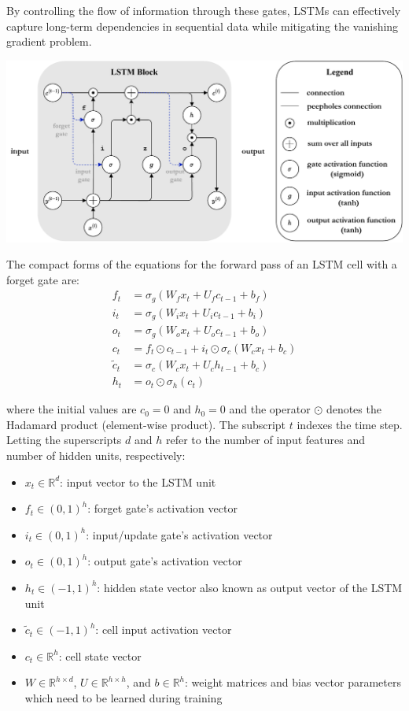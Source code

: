\documentclass[a4paper]{report}
\begin{document}
{By controlling the flow of information through these gates, LSTMs can effectively capture long-term dependencies in sequential data while mitigating the vanishing gradient problem.
\begin{center}
\includegraphics[width=0.9\linewidth]{lstm.pdf}
\end{center}
The compact forms of the equations for the forward pass of an LSTM cell with a forget gate are:
$${\displaystyle {\begin{aligned}f_{t}&=\sigma _{g}(W_{f}x_{t}+U_{f}c_{t-1}+b_{f})\\i_{t}&=\sigma _{g}(W_{i}x_{t}+U_{i}c_{t-1}+b_{i})\\o_{t}&=\sigma _{g}(W_{o}x_{t}+U_{o}c_{t-1}+b_{o})\\c_{t}&=f_{t}\odot c_{t-1}+i_{t}\odot \sigma _{c}(W_{c}x_{t}+b_{c})\\{\tilde {c}}_{t}&=\sigma _{c}(W_{c}x_{t}+U_{c}h_{t-1}+b_{c})\\h_{t}&=o_{t}\odot \sigma _{h}(c_{t})\end{aligned}}}$$

where the initial values are ${\displaystyle c_{0}=0}$ and ${\displaystyle h_{0}=0}$ and the operator ${\displaystyle \odot }$ denotes the Hadamard product (element-wise product). The subscript ${\displaystyle t}$ indexes the time step.\\
Letting the superscripts $d$ and $h$ refer to the number of input features and number of hidden units, respectively:

\begin{itemize}[leftmargin=*, itemsep=0pt, topsep=0pt, parsep=0pt] %
    \item $x_t \in \mathbb{R}^d$: input vector to the LSTM unit
    \item $f_t \in (0,1)^h$: forget gate's activation vector
    \item $i_t \in (0,1)^h$: input/update gate's activation vector
    \item $o_t \in (0,1)^h$: output gate's activation vector
    \item $h_t \in (-1,1)^h$: hidden state vector also known as output vector of the LSTM unit
    \item $\tilde{c}_t \in (-1,1)^h$: cell input activation vector
    \item $c_t \in \mathbb{R}^h$: cell state vector
    \item $W \in \mathbb{R}^{h \times d}$, $U \in \mathbb{R}^{h \times h}$, and $b \in \mathbb{R}^h$: weight matrices and bias vector parameters which need to be learned during training
\end{itemize}
}
\end{document}
